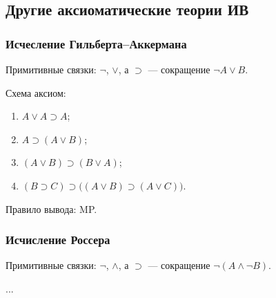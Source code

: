 \subsection{Другие аксиоматические теории ИВ}
\subsubsection{Исчесление Гильберта--Аккермана}

Примитивные связки: $\neg$, $\lor$, а $\supset$ --- сокращение $\neg A \lor B$.

Схема аксиом:
\begin{enumerate}[label=(А\arabic*)]
    \item $A \lor A \supset A$;
    \item $A \supset (A \lor B)$;
    \item $(A \lor B) \supset (B \lor A)$;
    \item $(B \supset C) \supset \big((A \lor B) \supset (A \lor C)\big)$.
\end{enumerate}

Правило вывода: MP.

\subsubsection{Исчисление Россера}
Примитивные связки: $\neg$, $\land$, а $\supset$ --- сокращение $\neg(A \land \neg B)$.

...